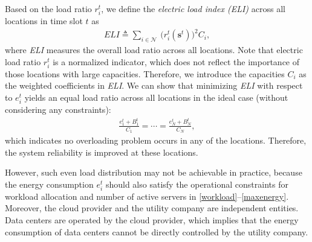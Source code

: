 \documentclass[journal]{IEEEtran}
\begin{document}
	Based on the load ratio $r_{i}^{t}$, we define the \emph{electric load index (ELI)} across all locations in time slot $t$ as
	\begin{align}\label{def_eli}
		ELI \triangleq \sum_{i \in \mathcal{N}}
		~ \Big( r_{i}^{t}(\boldsymbol{s}^{t}) \Big) ^{2} C_{i},
	\end{align}
	where \emph{ELI} measures the overall load ratio across all locations. Note that electric load ratio $r_{i}^{t}$ is a normalized indicator, which does not reflect the importance of those locations with large capacities. Therefore, we introduce the capacities $C_{i}$ as the weighted coefficients in \emph{ELI}. We can show that minimizing \emph{ELI} with respect to $e_{i}^{t}$  yields an equal load ratio across all locations in the ideal case (without considering any constraints):
	\begin{align*}
	\frac{e_{1}^{t}+B_{1}^{t}}{C_{1}} = \cdots = \frac{e_{N}^{t}+B_{N}^{t}}{C_{N}},
	\end{align*}
	which indicates no overloading problem occurs in any of the locations. Therefore, the system reliability is improved at these locations.
	
	However, such even load distribution may not be achievable in practice, because the energy consumption $e_{i}^{t}$ should also satisfy the operational constraints for workload allocation and number of active servers in \eqref{workload}--\eqref{maxenergy}. Moreover, the cloud provider and the utility company are independent entities. Data centers are operated by the cloud provider, which implies that the energy consumption of data centers cannot be directly controlled by the utility company.
\end{document}
